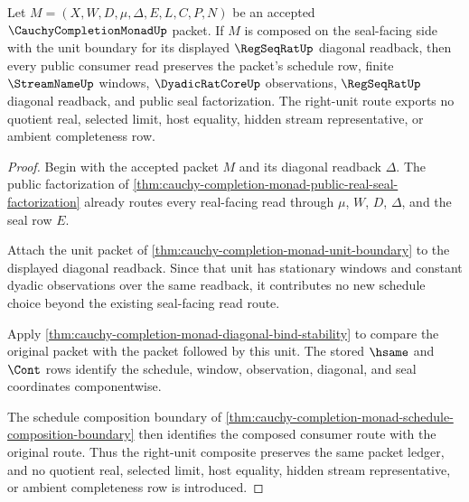 \begin{theorem}
\label{thm:cauchy-completion-monad-right-unit-factorization}
Let $M=(X,W,D,\mu,\Delta,E,L,C,P,N)$ be an accepted $\CauchyCompletionMonadUp$ packet. If $M$ is composed on the seal-facing side with the unit boundary for its displayed $\RegSeqRatUp$ diagonal readback, then every public consumer read preserves the packet's schedule row, finite $\StreamNameUp$ windows, $\DyadicRatCoreUp$ observations, $\RegSeqRatUp$ diagonal readback, and public seal factorization. The right-unit route exports no quotient real, selected limit, host equality, hidden stream representative, or ambient completeness row.
\end{theorem}
\begin{proof}
Begin with the accepted packet $M$ and its diagonal readback $\Delta$. The public factorization of \autoref{thm:cauchy-completion-monad-public-real-seal-factorization} already routes every real-facing read through $\mu$, $W$, $D$, $\Delta$, and the seal row $E$.

Attach the unit packet of \autoref{thm:cauchy-completion-monad-unit-boundary} to the displayed diagonal readback. Since that unit has stationary windows and constant dyadic observations over the same readback, it contributes no new schedule choice beyond the existing seal-facing read route.

Apply \autoref{thm:cauchy-completion-monad-diagonal-bind-stability} to compare the original packet with the packet followed by this unit. The stored $\hsame$ and $\Cont$ rows identify the schedule, window, observation, diagonal, and seal coordinates componentwise.

The schedule composition boundary of \autoref{thm:cauchy-completion-monad-schedule-composition-boundary} then identifies the composed consumer route with the original route. Thus the right-unit composite preserves the same packet ledger, and no quotient real, selected limit, host equality, hidden stream representative, or ambient completeness row is introduced.
\end{proof}

